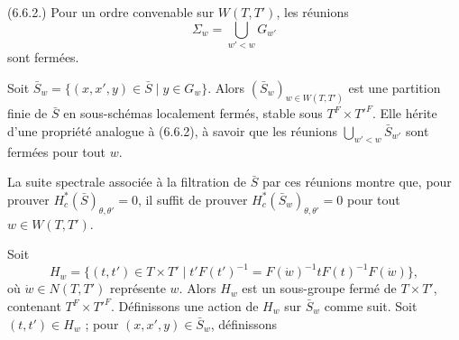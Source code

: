 \documentclass[9pt,twoside]{extarticle}
\begin{document}
{(6.6.2.) Pour un ordre convenable sur \(W(T,T')\), les réunions \[
\Sigma_w=\bigcup_{w'<w}G_{w'}
\] sont fermées.\par

Soit \(\bar S_w=\{(x,x',y)\in\bar S\mid y\in G_w\}\). Alors \((\bar S_w)_{w\in W(T,T')}\) est une partition finie de \(\bar S\) en sous-schémas localement fermés, stable sous \(T^F\times T'^F\). Elle hérite d'une propriété analogue à (6.6.2), à savoir que les réunions \(\bigcup_{w'<w}\bar S_{w'}\) sont fermées pour tout \(w\).\par

La suite spectrale associée à la filtration de \(\bar S\) par ces réunions montre que, pour prouver \(H_c^*(\bar S)_{\theta,\theta'}=0\), il suffit de prouver \(H_c^*(\bar S_w)_{\theta,\theta'}=0\) pour tout \(w\in W(T,T')\).\par

Soit \[
H_w=\{(t,t')\in T\times T'\mid t'F(t')^{-1}=F(\dot w)^{-1}tF(t)^{-1}F(\dot w)\},
\] où \(\dot w\in N(T,T')\) représente \(w\). Alors \(H_w\) est un sous-groupe fermé de \(T\times T'\), contenant \(T^F\times T'^F\). Définissons une action de \(H_w\) sur \(\bar S_w\) comme suit. Soit \((t,t')\in H_w\) ; pour \((x,x',y)\in\bar S_w\), définissons\par
}
\end{document}

